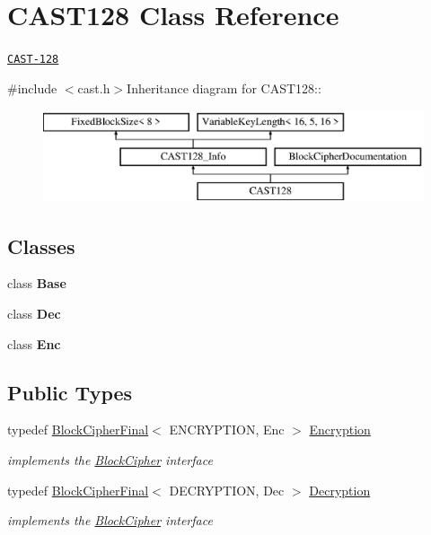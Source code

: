 \hypertarget{class_c_a_s_t128}{
\section{CAST128 Class Reference}
\label{class_c_a_s_t128}
}


\href{http://www.weidai.com/scan-mirror/cs.html#CAST-128}{\tt CAST-\/128}  


{\ttfamily \#include $<$cast.h$>$}Inheritance diagram for CAST128::\begin{figure}[H]
\begin{center}
\leavevmode
\includegraphics[height=2.73171cm]{class_c_a_s_t128}
\end{center}
\end{figure}
\subsection*{Classes}
\begin{DoxyCompactItemize}
\item 
class {\bfseries Base}
\item 
class {\bfseries Dec}
\item 
class {\bfseries Enc}
\end{DoxyCompactItemize}
\subsection*{Public Types}
\begin{DoxyCompactItemize}
\item 
\hypertarget{class_c_a_s_t128_a8780036d77194b12aab575ecb252d1f3}{
typedef \hyperlink{class_block_cipher_final}{BlockCipherFinal}$<$ ENCRYPTION, Enc $>$ \hyperlink{class_c_a_s_t128_a8780036d77194b12aab575ecb252d1f3}{Encryption}}
\label{class_c_a_s_t128_a8780036d77194b12aab575ecb252d1f3}

\begin{DoxyCompactList}\small\item\em implements the \hyperlink{class_block_cipher}{BlockCipher} interface \item\end{DoxyCompactList}\item 
\hypertarget{class_c_a_s_t128_a4c224b2baaec79fdcfcb05ef5255120e}{
typedef \hyperlink{class_block_cipher_final}{BlockCipherFinal}$<$ DECRYPTION, Dec $>$ \hyperlink{class_c_a_s_t128_a4c224b2baaec79fdcfcb05ef5255120e}{Decryption}}
\label{class_c_a_s_t128_a4c224b2baaec79fdcfcb05ef5255120e}

\begin{DoxyCompactList}\small\item\em implements the \hyperlink{class_block_cipher}{BlockCipher} interface \item\end{DoxyCompactList}\end{DoxyCompactItemize}


